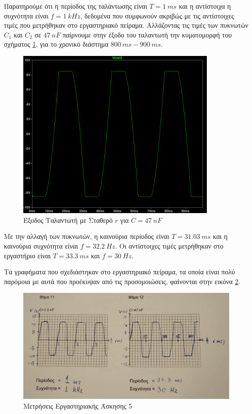 \documentclass[11pt,a4paper,twoside,onecolumn,openright,final]{memoir}
\begin{document}
Παρατηρούμε ότι η περίοδος της ταλάντωσης είναι \(T = 1 \ ms\) και η αντίστοιχα η συχνότητα είναι \(f = 1 \ kHz\), δεδομένα που συμφωνούν ακριβώς με τις αντίστοιχες τιμές που μετρήθηκαν στο εργαστηριακό πείραμα. Αλλάζοντας τις τιμές των πυκνωτών \(C_1\) και \(C_2\) σε \(47 \ nF\) παίρνουμε στην έξοδο του ταλαντωτή την κυματομορφή του σχήματος \ref{fig:ex5plot3}, για το χρονικό διάστημα \(800 \ ms- 900 \ ms\).

\newpage

\begin{figure}[H]
\centerfloat%
\includegraphics[width=10.0cm]{figures/exercise5plot3.png}
\caption{Έξοδος Ταλαντωτή με Σταθερό \(r\) για \(C = 47\ nF\)}\label{fig:ex5plot3}
\end{figure}



Με την αλλαγή των πυκνωτών, η καινούρια περίοδος είναι \(T = 31.03 \ ms\) και η καινούρια συχνότητα είναι \(f = 32.2 \ Hz\). Οι αντίστοιχες τιμές μετρήθηκαν στο εργαστήριο είναι \(T = 33.3 \ ms\) και \(f = 30 \ Hz\).



Τα γραφήματα που σχεδιάστηκαν στο εργαστηριακό πείραμα, τα οποία είναι πολύ παρόμοια με αυτά που προέκυψαν από τις προσομοιώσεις, φαίνονται στην εικόνα \ref{fig:ex5experiment}.

\begin{figure}[H]
\centerfloat%
\includegraphics[width=13.0cm]{figures/exercise5experiment.png}
\caption{Μετρήσεις Εργαστηριακής Άσκησης 5}\label{fig:ex5experiment}
\end{figure}
\end{document}
